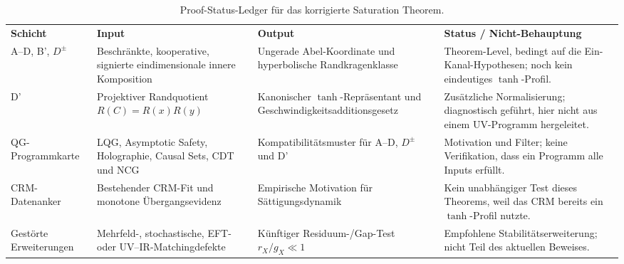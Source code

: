 \documentclass[aps,prd,twocolumn,superscriptaddress,nofootinbib]{revtex4-2}
\begin{document}
\begin{table}[t]
\caption{Proof-Status-Ledger für das korrigierte Saturation Theorem.}
\label{tab:proof_status_ledger}
\small
\begin{ruledtabular}
\begin{tabular}{@{}llll@{}}
\parbox[t]{0.14\textwidth}{\textbf{Schicht}} & \parbox[t]{0.24\textwidth}{\textbf{Input}} & \parbox[t]{0.22\textwidth}{\textbf{Output}} & \parbox[t]{0.27\textwidth}{\textbf{Status / Nicht-Behauptung}} \\
\parbox[t]{0.14\textwidth}{A--D, B', $D^\pm$} & \parbox[t]{0.24\textwidth}{Beschränkte, kooperative, signierte eindimensionale innere Komposition} & \parbox[t]{0.22\textwidth}{Ungerade Abel-Koordinate und hyperbolische Randkragenklasse} & \parbox[t]{0.27\textwidth}{Theorem-Level, bedingt auf die Ein-Kanal-Hypothesen; noch kein eindeutiges $\tanh$-Profil.} \\[0.6em]
\parbox[t]{0.14\textwidth}{D'} & \parbox[t]{0.24\textwidth}{Projektiver Randquotient $R(C)=R(x)R(y)$} & \parbox[t]{0.22\textwidth}{Kanonischer $\tanh$-Repräsentant und Geschwindigkeitsadditionsgesetz} & \parbox[t]{0.27\textwidth}{Zusätzliche Normalisierung; diagnostisch geführt, hier nicht aus einem UV-Programm hergeleitet.} \\[0.6em]
\parbox[t]{0.14\textwidth}{QG-Programmkarte} & \parbox[t]{0.24\textwidth}{LQG, Asymptotic Safety, Holographie, Causal Sets, CDT und NCG} & \parbox[t]{0.22\textwidth}{Kompatibilitätsmuster für A--D, $D^\pm$ und D'} & \parbox[t]{0.27\textwidth}{Motivation und Filter; keine Verifikation, dass ein Programm alle Inputs erfüllt.} \\[0.6em]
\parbox[t]{0.14\textwidth}{CRM-Datenanker} & \parbox[t]{0.24\textwidth}{Bestehender CRM-Fit und monotone Übergangsevidenz} & \parbox[t]{0.22\textwidth}{Empirische Motivation für Sättigungsdynamik} & \parbox[t]{0.27\textwidth}{Kein unabhängiger Test dieses Theorems, weil das CRM bereits ein $\tanh$-Profil nutzte.} \\[0.6em]
\parbox[t]{0.14\textwidth}{Gestörte Erweiterungen} & \parbox[t]{0.24\textwidth}{Mehrfeld-, stochastische, EFT- oder UV--IR-Matchingdefekte} & \parbox[t]{0.22\textwidth}{Künftiger Residuum-/Gap-Test $r_X/g_X \ll 1$} & \parbox[t]{0.27\textwidth}{Empfohlene Stabilitätserweiterung; nicht Teil des aktuellen Beweises.} \\
\end{tabular}
\end{ruledtabular}
\end{table}
\end{document}
